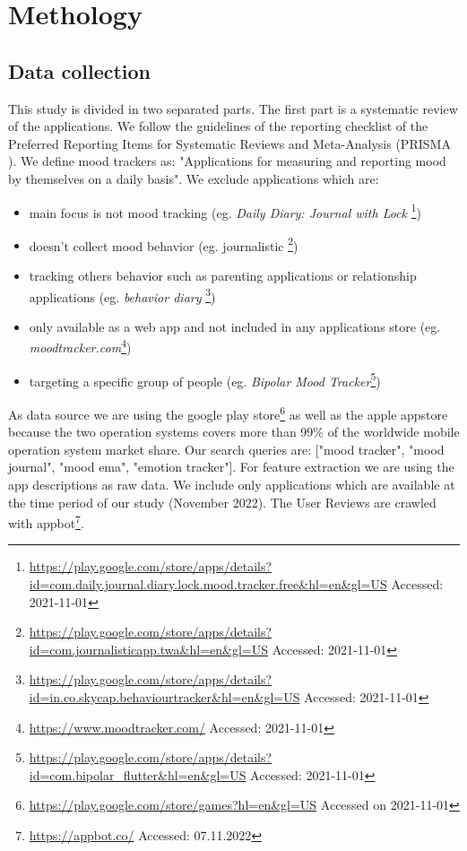 \chapter{Methology}
\label{ch:methology}
\section{Data collection}
\label{sec:data-collection}
This study is divided in two separated parts. The first part is a systematic review of the applications. We follow the guidelines of the reporting checklist of the Preferred Reporting Items for Systematic Reviews and Meta-Analysis (PRISMA \cite{moher2015preferred}).
We define mood trackers as:
"Applications for measuring and reporting mood by themselves on a daily basis".
We exclude applications which are:
\begin{itemize}
    \item main focus is not mood tracking (eg. \textit{Daily Diary: Journal with Lock} \footnote{\url{https://play.google.com/store/apps/details?id=com.daily.journal.diary.lock.mood.tracker.free&hl=en&gl=US} Accessed: 2021-11-01})
    \item doesn't collect mood behavior (eg. journalistic \footnote{\url{https://play.google.com/store/apps/details?id=com.journalisticapp.twa&hl=en&gl=US} Accessed: 2021-11-01})
    \item tracking others behavior such as parenting applications or relationship applications (eg. \textit{behavior diary} \footnote{\url{https://play.google.com/store/apps/details?id=in.co.skycap.behaviourtracker&hl=en&gl=US} Accessed: 2021-11-01})
    \item only available as a web app and not included in any applications store (eg. \textit{moodtracker.com}\footnote{\url{https://www.moodtracker.com/} Accessed: 2021-11-01})
    \item targeting a specific group of people (eg. \textit{Bipolar Mood Tracker}\footnote{\url{https://play.google.com/store/apps/details?id=com.bipolar_flutter&hl=en&gl=US} Accessed: 2021-11-01})
\end{itemize}
As data source we are using the google play store\footnote{\url{https://play.google.com/store/games?hl=en&gl=US} Accessed on 2021-11-01 } as well as the apple appstore because the two operation systems covers more than 99\% of the worldwide mobile operation system market share.
Our search queries are: ["mood tracker", "mood journal", "mood ema", "emotion tracker"].
For feature extraction we are using the app descriptions as raw data. We include only applications which are available at the time period of our study (November 2022).
The User Reviews are crawled with appbot\footnote{\url{https://appbot.co/} Accessed: 07.11.2022}.


